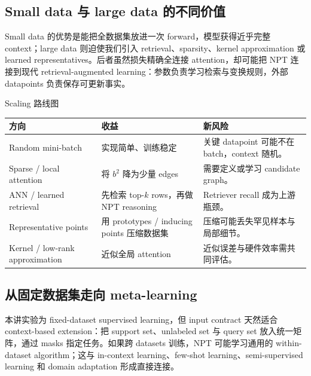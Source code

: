 \subsection{Small data 与 large data 的不同价值}

Small data 的优势是能把全数据集放进一次 forward，模型获得近乎完整 context；large data 则迫使我们引入 retrieval、sparsity、kernel approximation 或 learned representatives。后者虽然损失精确全连接 attention，却可能把 NPT 连接到现代 retrieval-augmented learning：参数负责学习检索与变换规则，外部 datapoints 负责保存可更新事实。


\begin{knowledgebox}{Scaling 路线图}
\begin{tabularx}{\textwidth}{L{0.24\textwidth}>{\raggedright\arraybackslash}X >{\raggedright\arraybackslash}X}
\toprule
方向 & 收益 & 新风险 \\
\midrule
Random mini-batch & 实现简单、训练稳定 & 关键 datapoint 可能不在 batch，context 随机。 \\
Sparse / local attention & 将 $b^2$ 降为少量 edges & 需要定义或学习 candidate graph。 \\
ANN / learned retrieval & 先检索 top-$k$ rows，再做 NPT reasoning & Retriever recall 成为上游瓶颈。 \\
Representative points & 用 prototypes / inducing points 压缩数据集 & 压缩可能丢失罕见样本与局部细节。 \\
Kernel / low-rank approximation & 近似全局 attention & 近似误差与硬件效率需共同评估。 \\
\bottomrule
\end{tabularx}
\end{knowledgebox}

\subsection{从固定数据集走向 meta-learning}

本讲实验为 fixed-dataset supervised learning，但 input contract 天然适合 context-based extension：把 support set、unlabeled set 与 query set 放入统一矩阵，通过 masks 指定任务。如果跨 datasets 训练，NPT 可能学习通用的 within-dataset algorithm；这与 in-context learning、few-shot learning、semi-supervised learning 和 domain adaptation 形成直接连接。

